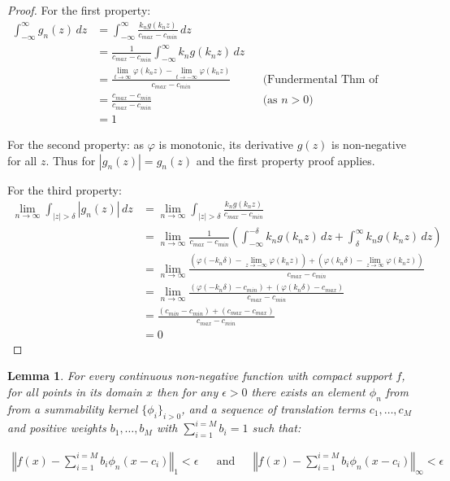 \documentclass{article} %
\newtheorem{lem}[thm]{Lemma}
\newcommand{\dlim}{\displaystyle\lim}
\begin{document}
\begin{proof}
For the first property:
\begin{align}
	\int_{-\infty}^{\infty} g_n(z) \, dz &=  \int_{-\infty}^{\infty} \frac{k_n g(k_nz)}{c_{max} - c_{min}} \, dz \\
	&= \frac{1}{c_{max} - c_{min}} \int_{-\infty}^{\infty} k_n g(k_n z) \, dz \\
	&= \frac{\dlim_{t \to \infty} \varphi(k_n z) - \dlim_{t \to -\infty} \varphi(k_n z)}{c_{max} - c_{min}} && \text{(Fundermental Thm of Calculus)}\\
	&= \frac{c_{max} - c_{min}}{c_{max} - c_{min}}  && \text{(as $n>0$)}\\
	&= 1	
\end{align}
	
For the second property: as  $\varphi$ is monotonic, its derivative $g(z)$ is non-negative for all $z$. Thus for $|g_n(z)|=g_n(z)$ and the first property proof applies.

For the third property:
\begin{align}
	\lim_{n\to\infty} \int_{|z|>\delta} |g_n(z)|\, dz 
	 &= \lim_{n\to\infty} \int_{|z|>\delta} \frac{k_n g(k_n z)}{c_{max} - c_{min}} \\
	 &= \lim_{n\to\infty} \frac{1}{c_{max} - c_{min}} 
		 \left( \int_{-\infty}^{-\delta} k_n g(k_n z) \, dz 
		 + \int_\delta^\infty k_n g(k_n z) \, dz \right) \\
	 &= \lim_{n\to\infty} \frac{
	 	\left(\varphi(-k_n\delta)-\dlim_{z \to -\infty} \varphi(k_n z)\right)
	 	 + \left( \varphi(k_n\delta) - \dlim_{z \to \infty} \varphi(k_n z)\right)}%
	 	 {c_{max} - c_{min}} \\
	 &= \lim_{n\to\infty} \frac{
	 	\left(\varphi(-k_n\delta)-c_{min} \right)
	 	+ \left( \varphi(k_n\delta) - c_{max} \right)}%
	    {c_{max} - c_{min}} \\
	 &= \frac{
	 	\left(c_{min}-c_{min} \right)
	 	+ \left(c_{max} - c_{max} \right)}%
		{c_{max} - c_{min}} \\
	 &= 0
\end{align}

\end{proof}

\begin{lem}\label{lem:approxwithsummability}
For every continuous non-negative function with compact support $f$,
for all points in its domain $x$
then for any $\epsilon >0$ there exists an element $\phi_n$ from from a summability kernel $\lbrace \phi_i  \rbrace_{i>0}$, and a sequence of translation terms $c_1,\ldots,c_M$ and positive weights $b_1,\ldots,b_M$ with $\sum_{i=1}^{i=M} b_i = 1$ such that:


\begin{align}
\left\Vert f(x)-\sum_{i=1}^{i=M}b_{i}\phi_{n}(x-c_i)\right\Vert _{1}<\epsilon &&
 \text{and} &&
\left\Vert f(x)-\sum_{i=1}^{i=M}b_{i}\phi_{n}(x-c_i)\right\Vert _{\infty}<\epsilon
\end{align}

\end{lem}
\end{document}
